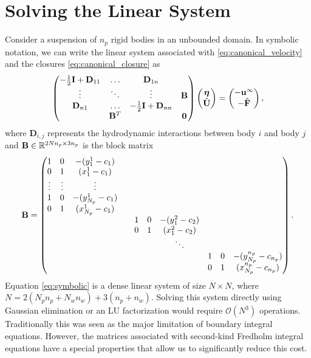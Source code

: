 \section{Solving the Linear System}\label{sec:linear_solve}

Consider a  suspension of $n_p$ rigid bodies in an unbounded domain. In symbolic notation, we can write the linear system associated with  \eqref{eq:canonical_velocity} and the closures \eqref{eq:canonical_closure} as
 \begin{equation}\label{eq:symbolic} \begin{pmatrix}-\frac{1}{2}\mathbf{I} + {\mathbf{D}}_{11} & \hdots & {\mathbf{D}}_{1n} & \\ \vdots & \ddots & \vdots & {\mathbf{B}}\\ {\mathbf{D}}_{n 1} & \hdots &-\frac{1}{2}\mathbf{I} +{\mathbf{D}}_{nn} & \\  & {\mathbf{B}}^T & & \mathbf{0} \end{pmatrix}\begin{pmatrix} \bm{\eta} \\ \hat{{\mathbf{U}}}\end{pmatrix} = \begin{pmatrix} -{\mathbf{u}}^{\infty} \\ -\hat{{\mathbf{F}}}\end{pmatrix},\end{equation}
where $\mathbf{D}_{i,j}$ represents the hydrodynamic interactions between body $i$ and body $j$ and ${\mathbf{B}}\in \mathbb{R}^{2Nn_p\times 3n_p}$ is the block matrix 
	\begin{equation}\label{eq:b_matrix}{\mathbf{B}} = \begin{pmatrix} 1 & 0 & -(y^1_1 - c_1)  & & & & &\\
				0 & 1 & (x^1_1 - c_1)& & & & & \\
				\vdots & \vdots & \vdots & & & & & &\\
				1 & 0 & -(y^1_{N_p}- c_1)& & & & & & \\
				0 & 1 & (x^1_{N_p} - c_1) & & & & & &\\
				& & & & 1 & 0 & -(y^2_1 - c_2) & &  \\
				& & & & 0 & 1 & (x^2_1 - c_2) & &  \\
				& & & & & & \ddots  & &  \\
				& & & & & & & 1 & 0 & -(y^{n_p}_{N_p} - c_{n_p})\\
				& & & & & & & 0 & 1 & (x^{n_p}_{N_p} - c_{n_p})\end{pmatrix}.\end{equation}
Equation \eqref{eq:symbolic} is a dense linear system  of size $N\times N$, where $N = 2(N_p n_p + N_w n_w) + 3(n_p + n_w)$. Solving this system directly using Gaussian elimination or an LU factorization would require $\mathcal{O}(N^3)$ operations. Traditionally this was seen as the major limitation of boundary integral equations. However, the matrices associated with second-kind Fredholm integral equations have a special properties that allow us to significantly reduce this cost.


